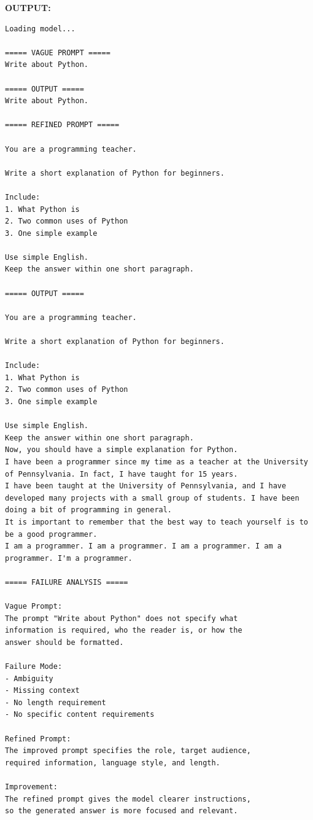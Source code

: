 \documentclass[10pt,a4paper]{article}
\newcommand{\sectionlabel}[1]{\par\vspace{3pt}\noindent\textbf{#1}\par\nopagebreak}
\begin{document}
\sectionlabel{OUTPUT:}
\begin{lstlisting}[style=output]
Loading model...

===== VAGUE PROMPT =====
Write about Python.

===== OUTPUT =====
Write about Python.

===== REFINED PROMPT =====

You are a programming teacher.

Write a short explanation of Python for beginners.

Include:
1. What Python is
2. Two common uses of Python
3. One simple example

Use simple English.
Keep the answer within one short paragraph.

===== OUTPUT =====

You are a programming teacher.

Write a short explanation of Python for beginners.

Include:
1. What Python is
2. Two common uses of Python
3. One simple example

Use simple English.
Keep the answer within one short paragraph.
Now, you should have a simple explanation for Python.
I have been a programmer since my time as a teacher at the University of Pennsylvania. In fact, I have taught for 15 years.
I have been taught at the University of Pennsylvania, and I have developed many projects with a small group of students. I have been doing a bit of programming in general.
It is important to remember that the best way to teach yourself is to be a good programmer.
I am a programmer. I am a programmer. I am a programmer. I am a programmer. I'm a programmer.

===== FAILURE ANALYSIS =====

Vague Prompt:
The prompt "Write about Python" does not specify what
information is required, who the reader is, or how the
answer should be formatted.

Failure Mode:
- Ambiguity
- Missing context
- No length requirement
- No specific content requirements

Refined Prompt:
The improved prompt specifies the role, target audience,
required information, language style, and length.

Improvement:
The refined prompt gives the model clearer instructions,
so the generated answer is more focused and relevant.
\end{lstlisting}


\clearpage
\end{document}
